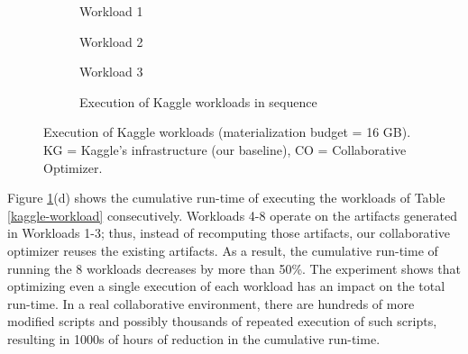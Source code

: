 \begin{figure}
\begin{subfigure}[b]{0.33\linewidth}
\centering
 \resizebox{\columnwidth}{!}{%
%
}
\caption{Workload 1}
\end{subfigure}%
\begin{subfigure}[b]{0.33\linewidth}
\centering
 \resizebox{\columnwidth}{!}{%
%
}
\caption{Workload 2}
\end{subfigure}%
\begin{subfigure}[b]{0.33\linewidth}
\centering
 \resizebox{\columnwidth}{!}{%
%
}
\caption{Workload 3}
\end{subfigure}
\begin{subfigure}[b]{\linewidth}
\centering
 \resizebox{\columnwidth}{!}{%
%
}
\caption{Execution of Kaggle workloads in sequence}
\end{subfigure}
\caption{Execution of Kaggle workloads (materialization budget = 16 GB). KG = Kaggle's infrastructure (our baseline), CO = Collaborative Optimizer.}
\label{exp-reuse-kaggle-same-workload}
\end{figure}

Figure \ref{exp-reuse-kaggle-same-workload}(d) shows the cumulative run-time of executing the workloads of Table \ref{kaggle-workload} consecutively.
Workloads 4-8 operate on the artifacts generated in Workloads 1-3; thus, instead of recomputing those artifacts, our collaborative optimizer reuses the existing artifacts.
As a result, the cumulative run-time of running the 8 workloads decreases by more than 50\%.
The experiment shows that optimizing even a single execution of each workload has an impact on the total run-time.
In a real collaborative environment, there are hundreds of more modified scripts and possibly thousands of repeated execution of such scripts, resulting in 1000s of hours of reduction in the cumulative run-time.

